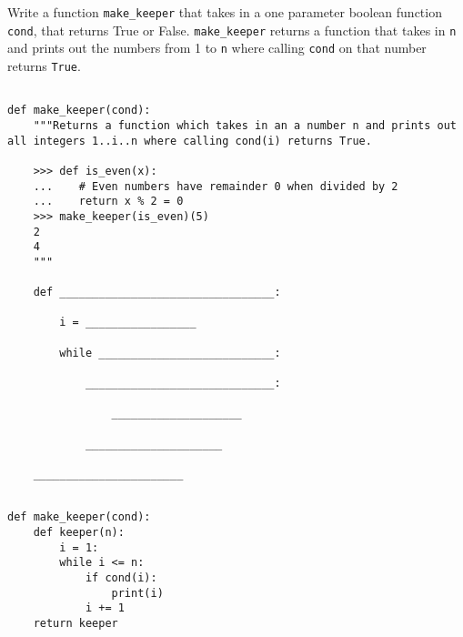 \begin{blocksection}
\question Write a function \lstinline{make_keeper} that takes in a one parameter boolean function \lstinline{cond}, that returns True or False. \lstinline{make_keeper} returns a function that takes in \lstinline{n} and prints out the numbers from 1 to \lstinline{n} where calling \lstinline{cond} on that number returns \lstinline{True}.

\begin{lstlisting}

def make_keeper(cond):
    """Returns a function which takes in an a number n and prints out all integers 1..i..n where calling cond(i) returns True.
    
    >>> def is_even(x):
    ...    # Even numbers have remainder 0 when divided by 2
    ...    return x % 2 = 0
    >>> make_keeper(is_even)(5)
    2
    4
    """
    
    def _________________________________:
    
        i = _________________
        
        while ___________________________:
        
            _____________________________:
            
                ____________________
                
            _____________________
            
    _______________________
    
\end{lstlisting}

\begin{solution}[1.5in]
\begin{lstlisting}
def make_keeper(cond):
    def keeper(n):
        i = 1:
        while i <= n:
            if cond(i):
                print(i)
            i += 1
    return keeper
\end{lstlisting}
\end{solution}
\end{blocksection}
